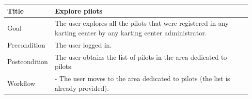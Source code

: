 \documentclass{beamer}
\begin{document}
\begin{frame}
\begin{table}
        \tiny
        \begin{tabular}{|p{2cm}|p{6cm}|}
        \hline  
        Title & \textbf{Explore pilots} \\
        \hline
        Goal & The user explores all the pilots that were registered in any karting center
        by any karting center administrator. \\
        \hline
        Precondition & The user logged in.\\
        \hline
        Postcondition & The user obtains the list of pilots in the area dedicated to pilots. \\
        \hline
        Workflow &
        - The user moves to the area dedicated to pilots (the list is already provided). \\
        \hline
        \end{tabular}
\end{table}

\end{frame}
\end{document}
